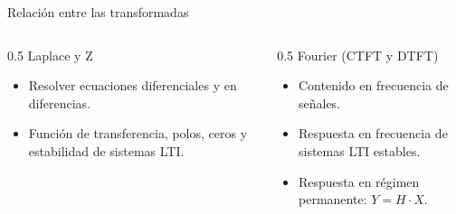 \documentclass[aspectratio=169,11pt]{beamer}
\begin{document}
\begin{frame}{Relación entre las transformadas}
  \begin{center}
  \end{center}
  \begin{columns}[T]
    \begin{column}{0.5\textwidth}
      \alert{Laplace y Z}
      \begin{itemize}\small
        \item Resolver ecuaciones diferenciales y en diferencias.
        \item Función de transferencia, polos, ceros y estabilidad de sistemas LTI.
      \end{itemize}
    \end{column}
    \begin{column}{0.5\textwidth}
      \alert{Fourier (CTFT y DTFT)}
      \begin{itemize}\small
        \item Contenido en frecuencia de señales.
        \item Respuesta en frecuencia de sistemas LTI estables.
        \item Respuesta en régimen permanente: $Y=H\cdot X$.
      \end{itemize}
    \end{column}
  \end{columns}
\end{frame}

\end{document}
